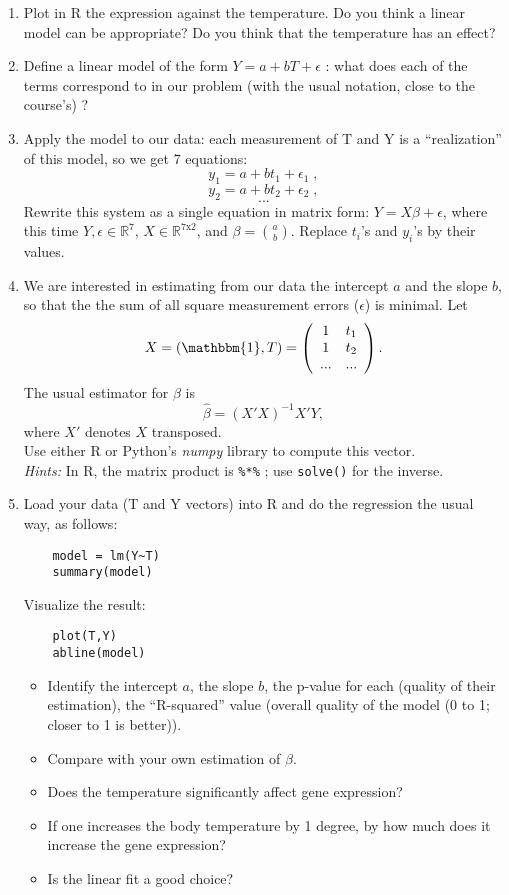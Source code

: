\documentclass[a4paper,11pt]{article}
\begin{document}
\begin{enumerate}
\item Plot in R the expression against the temperature. Do you think a linear model can be appropriate?
Do you think that the temperature has an effect?
\item Define a linear model of the form $Y = a + b T + \epsilon$ : what does each of the terms 
correspond to in our problem (with the usual notation, close to the course's) ?
\item Apply the model to our data: each measurement of T and Y is a ``realization'' of this model, so we get 7 equations:
$$y_1 = a + b t_1 + \epsilon_1 \; ,$$
$$y_2 = a + b t_2 + \epsilon_2 \; ,$$
$$...$$
Rewrite this system as a single equation in matrix form: $Y = X\beta + \epsilon$, where this time
$Y,\epsilon \in \mathbb{R}^7$, $X \in \mathbb{R}^{7\text{x}2}$, and $\beta={a \choose b}$.
Replace $t_i$'s and $y_i$'s by their values. \\

\item We are interested in estimating from our data the intercept $a$ and the slope $b$, 
so that the the sum of all square measurement errors ($\epsilon$) is minimal. 
Let 
$$
X = (\mathbbm{1}, T) = \left( 
\begin{array}{cc}
1 & t_1 \\
1 & t_2 \\
... & ...
\end{array}
\right) .
$$
The usual estimator for $\beta$ is 
$$\hat{\beta} = (X'X)^{-1}X'Y ,$$
where $X'$ denotes $X$ transposed.\\
Use either R or Python's \textit{numpy} library to compute this vector. \\
\textit{Hints:} In R, the matrix product is \texttt{\%*\%} ; use \texttt{solve()} for the inverse.

\item Load your data (T and Y vectors) into R and do the regression the usual way, as follows: 
\begin{verbatim}
	model = lm(Y~T)
	summary(model)
\end{verbatim}	
Visualize the result:
\begin{verbatim}
	plot(T,Y)
	abline(model)
\end{verbatim}
\begin{itemize}
	\item Identify the intercept $a$, the slope $b$, the p-value for each (quality of 
		their estimation), the ``R-squared'' value (overall quality of the model (0 to 1; closer to 1 is better)).
	\item Compare with your own estimation of $\beta$. 
	\item Does the temperature significantly affect gene expression? 
	\item If one increases the body temperature by 1 degree, by how much does it increase the gene expression?
	\item Is the linear fit a good choice?
\end{itemize}

\end{enumerate}
\end{document}
